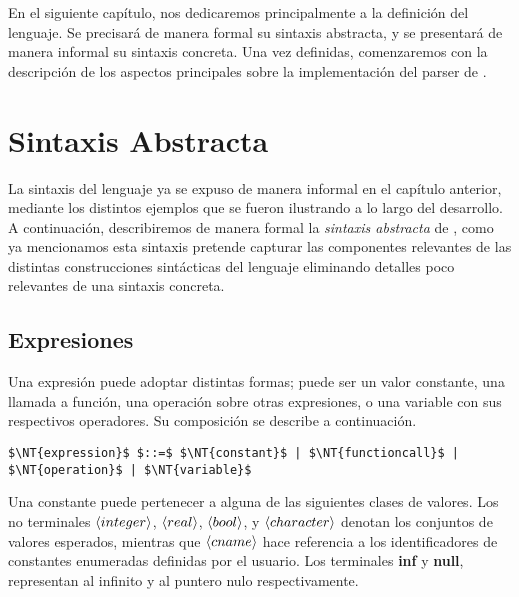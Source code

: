 En el siguiente capítulo, nos dedicaremos principalmente a la definición del lenguaje.
Se precisará de manera formal su sintaxis abstracta, y se presentará de manera informal su sintaxis concreta.
Una vez definidas, comenzaremos con la descripción de los aspectos principales sobre la implementación del parser de \Lenguaje{}.

\section{Sintaxis Abstracta}

La sintaxis del lenguaje ya se expuso de manera informal en el capítulo anterior, mediante los distintos ejemplos que se fueron ilustrando a lo largo del desarrollo. A continuación, describiremos de manera formal la \textit{sintaxis abstracta} de \Lenguaje{}, como ya mencionamos esta sintaxis
pretende capturar las componentes relevantes de las distintas construcciones sintácticas del lenguaje eliminando detalles poco relevantes de una sintaxis
concreta.

\subsection{Expresiones}

Una expresión puede adoptar distintas formas; puede ser un valor constante, una llamada a función, una operación sobre otras expresiones, o una variable con sus respectivos operadores.
Su composición se describe a continuación.

\begin{lstlisting}[style = syntax]
$\NT{expression}$ $::=$ $\NT{constant}$ | $\NT{functioncall}$ | $\NT{operation}$ | $\NT{variable}$
\end{lstlisting}

Una constante puede pertenecer a alguna de las siguientes clases de valores.
Los no terminales $\langle integer \rangle$, $\langle real \rangle$, $\langle bool \rangle$, y $\langle character \rangle$ denotan los conjuntos de valores esperados, mientras que $\langle cname \rangle$ hace referencia a los identificadores de constantes enumeradas definidas por el usuario.
Los terminales \textbf{inf} y \textbf{null}, representan al infinito y al puntero nulo respectivamente.

